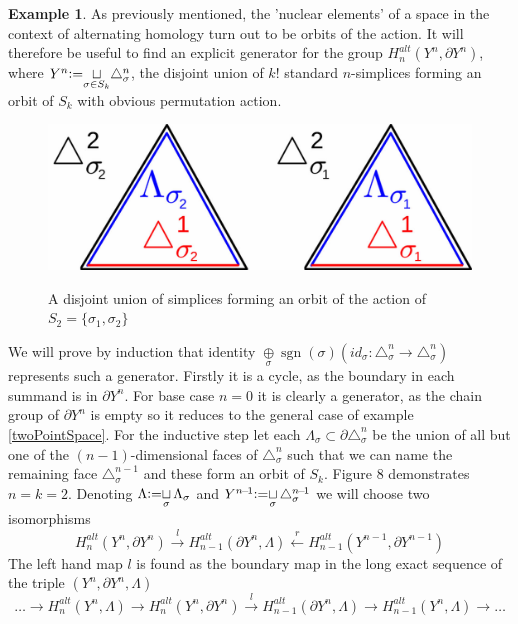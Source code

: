 \documentclass[11pt,a4paper,twoside]{article}
\theoremstyle{plain}
\theoremstyle{definition}
\theoremstyle{definition}
\theoremstyle{definition}
\theoremstyle{definition}
\newtheorem{example}[thm]{Example}
\theoremstyle{definition}
\DeclareMathOperator{\sgn}{sgn}
\DeclareMathOperator{\coloneqq}{\vcentcolon=}
\begin{document}
\vspace{2mm}
\begin{example}\label{Ex:OrbitGenerator} As previously mentioned, the 'nuclear elements' of a space in the context of alternating homology turn out to be orbits of the action. It will therefore be useful to find an explicit generator for the group $H_n^{alt}(Y^n,\partial Y^n)$, where $Y^n\!\coloneqq\!\underset{\sigma\in S_k}{\sqcup}\triangle^n_\sigma$, the disjoint union of $k!$ standard $n$-simplices forming an orbit of $S_k$ with obvious permutation action.
\begin{figure}
\centering
\includegraphics[scale=0.20]{Images/SimplexOrbit.jpg}
\label{fig:SimplexOrbit}
\caption{A disjoint union of simplices forming an orbit of the action of $S_2=\{\sigma_1,\sigma_2\}$}
\end{figure}
We will prove by induction that identity  $\underset{\sigma}\oplus\sgn(\sigma)(id_\sigma\!:\!\triangle_\sigma^n\!\rightarrow\!\triangle_\sigma^n)$ represents such a generator. Firstly it is a cycle, as the boundary in each summand is in $\partial Y^n$. For base case $n=0$ it is clearly a generator, as the chain group of $\partial Y^n$ is empty so it reduces to the general case of example \ref{twoPointSpace}. For the inductive step let each $\Lambda_\sigma\subset\partial\triangle^n_\sigma$ be the union of all but one of the $(n\!-\!1)$-dimensional faces of $\triangle^n_\sigma$ such that we can name the remaining face $\triangle_\sigma^{n\!-\!1}$ and these form an orbit of $S_k$. Figure 8 demonstrates $n=k=2$. Denoting $\Lambda\!\coloneqq\!\underset\sigma\sqcup\,\Lambda_\sigma$ and $Y^{n\!-\!1}\!\coloneqq\!\underset\sigma\sqcup\,\triangle^{n\!-\!1}_\sigma$ we will choose two isomorphisms
$$H_n^{alt}(Y^n,\partial Y^n)\overset{{l}}{\longrightarrow} H_{n-1}^{alt}(\partial Y^n,\Lambda)\overset{{r}}\longleftarrow H_{n-1}^{alt}(Y^{n\!-\!1},\partial Y^{n\!-\!1})$$
The left hand map ${l}$ is found as the boundary map in the long exact sequence of the triple $(Y^n,\partial Y^n,\Lambda )$
$$\dots\longrightarrow H_n^{alt}(Y^n,\Lambda)\longrightarrow H_n^{alt}(Y^n,\partial Y^n)\overset{l}\longrightarrow H_{n\!-\!1}^{alt}(\partial Y^n, \Lambda)\longrightarrow H_{n\!-\!1}^{alt}(Y^n,\Lambda)\longrightarrow\dots$$

\end{example}
\end{document}
